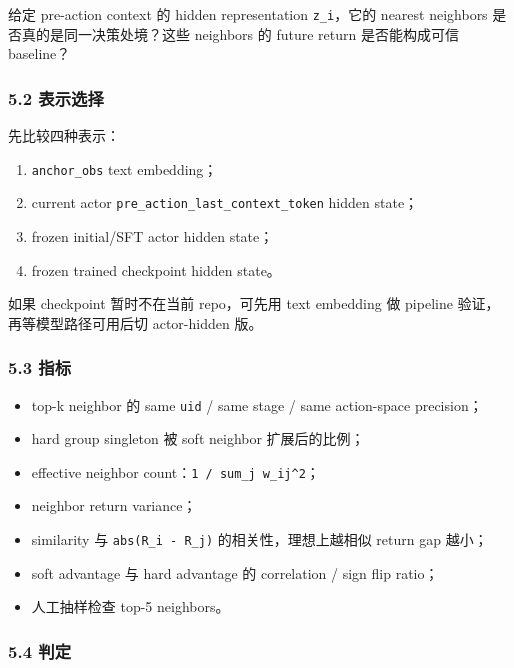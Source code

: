 \documentclass[
  10pt,
]{ctexart}
\providecommand{\tightlist}{%
  \setlength{\itemsep}{0pt}\setlength{\parskip}{0pt}}
\begin{document}
给定 pre-action context 的 hidden representation \texttt{z\_i}，它的
nearest neighbors 是否真的是同一决策处境？这些 neighbors 的 future
return 是否能构成可信 baseline？

\subsubsection{5.2 表示选择}\label{ux8868ux793aux9009ux62e9}

先比较四种表示：

\begin{enumerate}
\def\labelenumi{\arabic{enumi}.}
\tightlist
\item
  \texttt{anchor\_obs} text embedding；
\item
  current actor \texttt{pre\_action\_last\_context\_token} hidden
  state；
\item
  frozen initial/SFT actor hidden state；
\item
  frozen trained checkpoint hidden state。
\end{enumerate}

如果 checkpoint 暂时不在当前 repo，可先用 text embedding 做 pipeline
验证，再等模型路径可用后切 actor-hidden 版。

\subsubsection{5.3 指标}\label{ux6307ux6807-1}

\begin{itemize}
\tightlist
\item
  top-k neighbor 的 same \texttt{uid} / same stage / same action-space
  precision；
\item
  hard group singleton 被 soft neighbor 扩展后的比例；
\item
  effective neighbor count：\texttt{1\ /\ sum\_j\ w\_ij\^{}2}；
\item
  neighbor return variance；
\item
  similarity 与 \texttt{abs(R\_i\ -\ R\_j)} 的相关性，理想上越相似
  return gap 越小；
\item
  soft advantage 与 hard advantage 的 correlation / sign flip ratio；
\item
  人工抽样检查 top-5 neighbors。
\end{itemize}

\subsubsection{5.4 判定}\label{ux5224ux5b9a-1}
\end{document}
